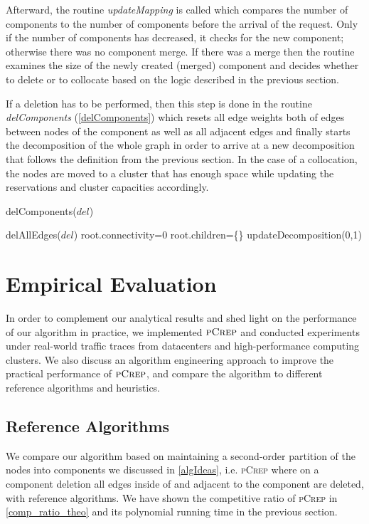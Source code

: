 \documentclass[a4paper,UKenglish,cleveref, autoref, thm-restate,authorcolumns]{../lipics/lipics-v2019}
\newcommand{\adjDel}{\textsc{pCrep}}
\begin{document}
Afterward, the routine \textit{updateMapping} is called which compares the number of components to the number of components before the arrival of the request. Only if the number of components has decreased, it checks for the new component; otherwise there was no component merge. 
If there was a merge then the routine examines the size of the newly created (merged) component and decides whether to delete or to collocate based on the logic described in the previous section.

If a deletion has to be performed, then this step is done in the routine \textit{delComponents} (\cref{delComponents}) which resets all edge weights both of edges between nodes of the component as well as all adjacent edges and finally starts the decomposition of the whole graph in order to arrive at a new decomposition that follows the definition from the previous section.
In the case of a collocation, the nodes are moved to a cluster that has enough space while updating the reservations and cluster capacities accordingly.



\begin{algorithm}
	\caption{delComponents($del$)}
	\label{delComponents}
	\begin{algorithmic}
		\STATE delAllEdges($del$)
		\STATE root.connectivity=0
		\STATE root.children=\{\}
		\STATE updateDecomposition(0,1)
	\end{algorithmic}
\end{algorithm}

\section{Empirical Evaluation}
\label{sec:evaluation}

In order to complement our analytical results and shed light
on the performance of our algorithm in practice, 
we implemented $\adjDel$ and conducted experiments
under real-world traffic traces from datacenters
and high-performance computing clusters. 
We also discuss an algorithm engineering approach to improve the practical
performance of $\adjDel$, and compare the algorithm to different reference algorithms
and heuristics.

\subsection{Reference Algorithms}
\label{algSection}

We compare our algorithm based on maintaining a second-order partition of the nodes into components we discussed in \cref{algIdeas}, 
i.e. \adjDel{} where on a component deletion all edges inside of and adjacent to the component are deleted, with reference algorithms. 
We have shown the competitive ratio of \adjDel{} in \cref{comp_ratio_theo} and its polynomial running time in the previous section.
\end{document}
